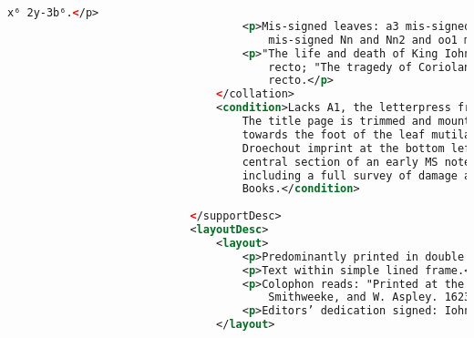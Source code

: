 \documentclass[class=article, crop=false]{standalone}
\begin{document}
\begin{lstlisting}[language=XML]
                                        x⁶ 2y-3b⁶.</p>
                                    <p>Mis-signed leaves: a3 mis-signed Aa3; ³gg1 mis-signed Gg; nn1-nn2
                                        mis-signed Nn and Nn2 and oo1 mis-signed Oo.</p>
                                    <p>"The life and death of King Iohn" begins new pagination on leaf a1
                                        recto; "The tragedy of Coriolanus" begins new pagination on leaf aa1
                                        recto.</p>
                                </collation>
                                <condition>Lacks A1, the letterpress frontispiece entitled "To the reader".
                                    The title page is trimmed and mounted, with a section of the mount
                                    towards the foot of the leaf mutilated resulting in the loss of some the
                                    Droechout imprint at the bottom left hand corner of the portrait and the
                                    central section of an early MS note. For a full condition report,
                                    including a full survey of damage and repairs, please contact Rare
                                    Books.</condition>
                                
                            </supportDesc>
                            <layoutDesc>
                                <layout>
                                    <p>Predominantly printed in double columns.</p>
                                    <p>Text within simple lined frame.</p>
                                    <p>Colophon reads: "Printed at the charges of W. Iaggard, Ed. Blount, I.
                                        Smithweeke, and W. Aspley. 1623.".</p>
                                    <p>Editors’ dedication signed: Iohn Heminge. Henry Condell.</p>
                                </layout>
                                

\end{lstlisting}
\end{document}

